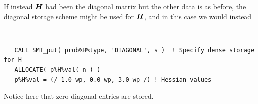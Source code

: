 \documentclass{galahad}
\begin{document}
If instead ${\bm{H}}$ had been the diagonal matrix
but the other data is as before, the diagonal storage scheme
might be used for ${\bm{H}}$, and in this case we would instead
{\tt \small
\begin{verbatim}
   CALL SMT_put( prob%H%type, 'DIAGONAL', s )  ! Specify dense storage for H
   ALLOCATE( p%H%val( n ) )
   p%H%val = (/ 1.0_wp, 0.0_wp, 3.0_wp /) ! Hessian values
\end{verbatim}
}
\noindent
Notice here that zero diagonal entries are stored.
\end{document}
